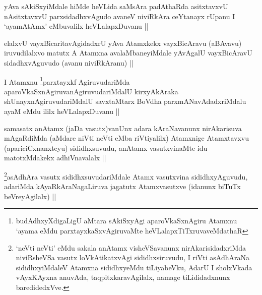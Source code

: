 \begin{artha}
yAva sAkiSxyiMdale hiMde heVLida saMsAra padAthaRda asitxtavxvU
nAsitxtavxvU parxsidadhxvAgudo avaneV niviRkAra ceYtanayx rUpanu I
`ayamAtAmx' eMbuvalilx heVLalapxDuvanu ||
\end{artha}


\begin{artha}
elalxvU vayxBicaritavAgidadxrU yAva Atamxkekx vayxBicAravu (aBAvavu)
iruvudilalxvo matutx A Atamxna avalaMbaneyiMdale yAvAgalU vayxBicAravU
sidadhxvAguvudo (avanu niviRkAranu) ||
\end{artha}


\begin{artha}
I Atamxnu \footnote{budAdhxyXdigaLigU aMtara sAkiSxyAgi
  aparoVkaSxnAgiru Atamxnu `ayama eMdu parxtayxkaSxvAgiruvaMte heVLalapxTiTxruvaveMdathaR}parxtayxkf AgiruvudariMda
aparoVkaSxnAgiruvanAgiruvudariMdalU kirxyAkAraka
shUnayxnAgiruvudariMdalU savxtaMtarx BoVdha parxmANavAdadxriMdalu ayaM
eMdu ililx heVLalapxDuvanu ||
\end{artha}


\begin{artha}
samasatx anAtamx (jaDa vasutx)vanUnx adara kAraNavanunx nirAkarisuva
mAgaRdiMda (aMdare niVti neVti eMba riVtiyalilx) Atamxnige Atamxtavxvu
(apariciCxnanxteyu) sididhxsuvudu, anAtamx vasutxvinaMte idu
matotxMdakekx adhiVnavalalx ||
\end{artha}


\begin{artha}
\footnote{`neVti neVti' eMdu sakala anAtamx visheVSavanunx
  nirAkarisidadxriMda niviRsheVSa vasutx loVkAtikatxvAgi
  sididhxsiruvudu, I riVti asAdhAraNa sididhxyiMdaleV Atamxna
  sididhxyeMdu tiLiyabeVku, AdarU I sholxVkada vAyxKAyxna anuvAda,
  taqpitxkaravAgilalx, namage tiLididadxnunx baredidedxVve.}asAdhAra vasutx sididhxsuvudariMdale Atamx vasutxvina
sididhxyAguvudu, adariMda kAyaRkAraNagaLiruva jagatutx Atamxvasutxve
(idanunx biTuTx beVreyAgilalx) ||
\end{artha}

